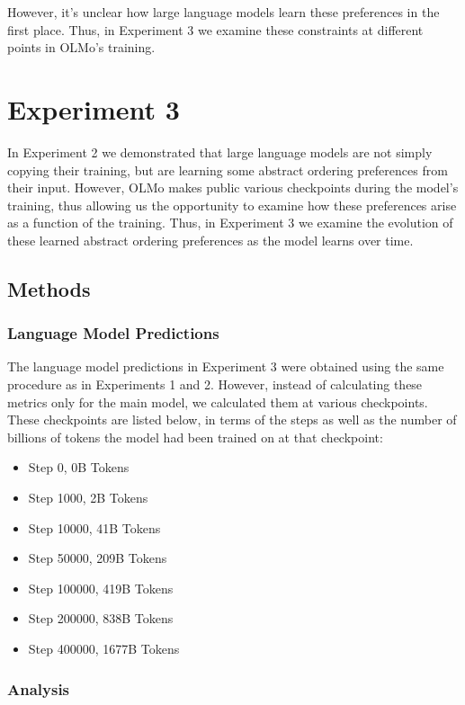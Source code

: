 \documentclass[
  12pt,
  letterpaper,
]{scrreprt}
\begin{document}
However, it's unclear how large language models learn these preferences
in the first place. Thus, in Experiment 3 we examine these constraints
at different points in OLMo's training.

\section{Experiment 3}\label{experiment-3-1}

In Experiment 2 we demonstrated that large language models are not
simply copying their training, but are learning some abstract ordering
preferences from their input. However, OLMo makes public various
checkpoints during the model's training, thus allowing us the
opportunity to examine how these preferences arise as a function of the
training. Thus, in Experiment 3 we examine the evolution of these
learned abstract ordering preferences as the model learns over time.

\subsection{Methods}\label{methods-7}

\subsubsection{Language Model
Predictions}\label{language-model-predictions-2}

The language model predictions in Experiment 3 were obtained using the
same procedure as in Experiments 1 and 2. However, instead of
calculating these metrics only for the main model, we calculated them at
various checkpoints. These checkpoints are listed below, in terms of the
steps as well as the number of billions of tokens the model had been
trained on at that checkpoint:

\begin{itemize}
\item
  Step 0, 0B Tokens
\item
  Step 1000, 2B Tokens
\item
  Step 10000, 41B Tokens
\item
  Step 50000, 209B Tokens
\item
  Step 100000, 419B Tokens
\item
  Step 200000, 838B Tokens
\item
  Step 400000, 1677B Tokens
\end{itemize}

\subsubsection{Analysis}\label{analysis-3}
\end{document}
